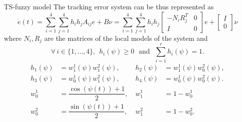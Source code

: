 
\begin{frame}
	\begin{block}{TS-fuzzy model}
	The tracking error system can be thus represented as
	\begin{equation}
	\dot{e}(t) = \sum_{i=1}^{4}\sum_{j=1}^{4}h_i h_jA_{ij}e+B\nu =\sum_{i=1}^{4}\sum_{j=1}^{4}h_i h_j\begin{bmatrix}
	-N_iR_j^T & 0 \\
	I & 0
	\end{bmatrix}e+\begin{bmatrix}
	I\\
	0
	\end{bmatrix}\nu
	\end{equation} where $N_i,R_j$ are the matrices of the local models of the system and 
		\begin{equation} 
		\forall\, i\in\{1,\ldots, 4\},~~h_i(\psi) \geq 0 \text{~~and~~} \sum_{i=1}^{r}h_i(\psi)=1.
		\end{equation}
		\begin{equation}
		\begin{aligned}
		h_{1}(\psi)&=w_1^1(\psi)w_1^2(\psi),& h_{2}(\psi)&=w_1^1(\psi)w_0^2(\psi),\\
		h_{3}(\psi)&=w_0^1(\psi)w_1^2(\psi),& h_{4}(\psi)&=w_0^1(\psi)w_0^2(\psi). \\
			w_0^1&=\dfrac{\cos(\psi(t))+1}{2},~& w_1^1&=1-w_0^1\\
	w_0^2&=\dfrac{\sin(\psi(t))+1}{2},~& w_1^2&=1-w_0^2.
		\end{aligned}    
		\end{equation}

	\end{block}
\end{frame}

